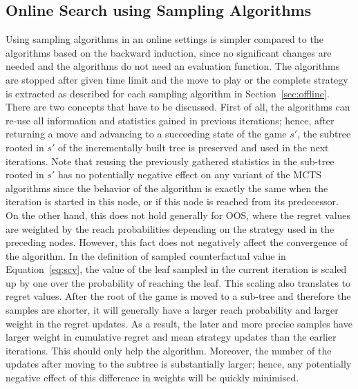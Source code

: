 \subsection{Online Search using Sampling Algorithms}

Using sampling algorithms in an online settings is simpler compared to the algorithms based on the backward induction, since no significant changes are needed and the algorithms do not need an evaluation function.
The algorithms are stopped after given time limit and the move to play or the complete strategy is extracted as described for each sampling algorithm in Section~\ref{sec:offline}.
There are two concepts that have to be discussed. 
First of all, the algorithms can re-use all information and statistics gained in previous iterations; hence, after returning a move and advancing to a succeeding state of the game $s'$, the subtree rooted in $s'$ of the incrementally built tree is preserved and used in the next iterations. 
Note that reusing the previously gathered statistics in the sub-tree rooted in $s'$ has no potentially negative effect on any variant of the MCTS algorithms since the behavior of the algorithm is exactly the same when the iteration is started in this node, or if this node is reached from its predecessor. On the other hand, this does not hold generally for OOS, where the regret values are weighted by the reach probabilities depending on the strategy used in the preceding nodes.  However, this fact does not negatively affect the convergence of the algorithm. In the definition of sampled counterfactual value in Equation~\ref{eq:scv}, the value of the leaf sampled in the current iteration is scaled up by one over the probability of reaching the leaf. This scaling also translates to regret values. After the root of the game is moved to a sub-tree and therefore the samples are shorter, it will generally have a larger reach probability and larger weight in the regret updates. As a result, the later and more precise samples have larger weight in cumulative regret and mean strategy updates than the earlier iterations. This should only help the algorithm. Moreover, the number of the updates after moving to the subtree is substantially larger; hence, any potentially negative effect of this difference in weights will be quickly minimised.


